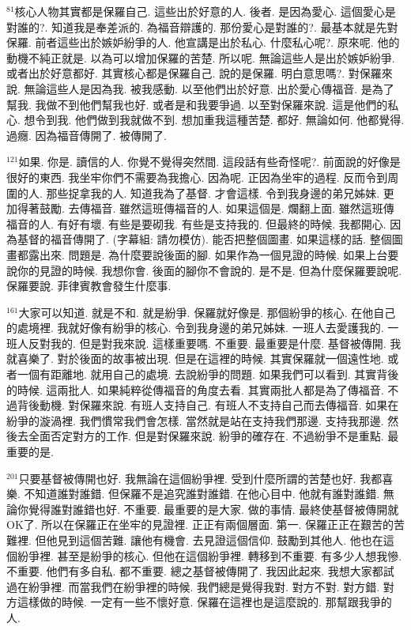 \documentclass{book}
\begin{document}
$^{81}$核心人物其實都是保羅自己.
這些出於好意的人.
後者.
是因為愛心.
這個愛心是對誰的?.
知道我是奉差派的.
為福音辯護的.
那份愛心是對誰的?.
最基本就是先對保羅.
前者這些出於嫉妒紛爭的人.
他宣講是出於私心.
什麼私心呢?.
原來呢.
他的動機不純正就是.
以為可以增加保羅的苦楚.
所以呢.
無論這些人是出於嫉妒紛爭.
或者出於好意都好.
其實核心都是保羅自己.
說的是保羅.
明白意思嗎?.
對保羅來說.
無論這些人是因為我.
被我感動.
以至他們出於好意.
出於愛心傳福音.
是為了幫我.
我做不到他們幫我也好.
或者是和我要爭過.
以至對保羅來說.
這是他們的私心.
想令到我.
他們做到我就做不到.
想加重我這種苦楚.
都好.
無論如何.
他都覺得.
過癮.
因為福音傳開了.
被傳開了.

$^{121}$如果.
你是.
讀信的人.
你覺不覺得突然間.
這段話有些奇怪呢?.
前面說的好像是很好的東西.
我坐牢你們不需要為我擔心.
因為呢.
正因為坐牢的過程.
反而令到周圍的人.
那些捉拿我的人.
知道我為了基督.
才會這樣.
令到我身邊的弟兄姊妹.
更加得著鼓勵.
去傳福音.
雖然這班傳福音的人.
如果這個是.
爛翻上面.
雖然這班傳福音的人.
有好有壞.
有些是要砌我.
有些是支持我的.
但最終的時候.
我都開心.
因為基督的福音傳開了.
(字幕組: 請勿模仿).
能否把整個圖畫.
如果這樣的話.
整個圖畫都露出來.
問題是.
為什麼要說後面的腳.
如果作為一個見證的時候.
如果上台要說你的見證的時候.
我想你會.
後面的腳你不會說的.
是不是.
但為什麼保羅要說呢.
保羅要說.
菲律賓教會發生什麼事.

$^{161}$大家可以知道.
就是不和.
就是紛爭.
保羅就好像是.
那個紛爭的核心.
在他自己的處境裡.
我就好像有紛爭的核心.
令到我身邊的弟兄姊妹.
一班人去愛護我的.
一班人反對我的.
但是對我來說.
這樣重要嗎.
不重要.
最重要是什麼.
基督被傳開.
我就喜樂了.
對於後面的故事被出現.
但是在這裡的時候.
其實保羅就一個遠性地.
或者一個有距離地.
就用自己的處境.
去說紛爭的問題.
如果我們可以看到.
其實背後的時候.
這兩批人.
如果純粹從傳福音的角度去看.
其實兩批人都是為了傳福音.
不過背後動機.
對保羅來說.
有班人支持自己.
有班人不支持自己而去傳福音.
如果在紛爭的漩渦裡.
我們慣常我們會怎樣.
當然就是站在支持我們那邊.
支持我那邊.
然後去全面否定對方的工作.
但是對保羅來說.
紛爭的確存在.
不過紛爭不是重點.
最重要的是.

$^{201}$只要基督被傳開也好.
我無論在這個紛爭裡.
受到什麼所謂的苦楚也好.
我都喜樂.
不知道誰對誰錯.
但保羅不是追究誰對誰錯.
在他心目中.
他就有誰對誰錯.
無論你覺得誰對誰錯也好.
不重要.
最重要的是大家.
做的事情.
最終使基督被傳開就OK了.
所以在保羅正在坐牢的見證裡.
正正有兩個層面.
第一.
保羅正正在艱苦的苦難裡.
但他見到這個苦難.
讓他有機會.
去見證這個信仰.
鼓勵到其他人.
他也在這個紛爭裡.
甚至是紛爭的核心.
但他在這個紛爭裡.
轉移到不重要.
有多少人想我慘.
不重要.
他們有多自私.
都不重要.
總之基督被傳開了.
我因此起來.
我想大家都試過在紛爭裡.
而當我們在紛爭裡的時候.
我們總是覺得我對.
對方不對.
對方錯.
對方這樣做的時候.
一定有一些不懷好意.
保羅在這裡也是這麼說的.
那幫跟我爭的人.
\end{document}
